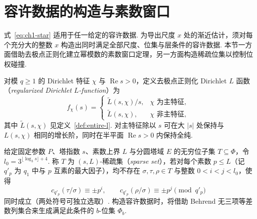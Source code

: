 \section{容许数据的构造与素数窗口}
\label{sec:data-construction}

式~\eqref{eq:ch1-star} 适用于任一给定的容许数据. 为导出尺度 $x$ 处的渐近估计，须对每个充分大的整数 $x$ 构造出同时满足全部尺度、位集与层条件的容许数据. 本节一方面借助去极点正则化建立幂模数的素数窗口定理，另一方面构造稀疏位集以控制位权碰撞.

\begin{definition}
\label{def:regular-l}
\emitthmsource
对模 $q\ge1$ 的 Dirichlet 特征 $\chi$ 与 $\operatorname{Re}s>0$，定义去极点正则化 Dirichlet $L$ 函数（\emph{regularized Dirichlet $L$-function}）为
\[
 f_\chi(s)=
 \begin{cases}
  \widetilde L(s,\chi)/s,&\chi\text{ 为主特征},\\
  \widetilde L(s,\chi),&\chi\text{ 非主特征},
 \end{cases}
\]
其中 $\widetilde L(s,\chi)$ 见定义~\ref{def:entire-l}. 对主特征除以 $s$ 可在大 $|s|$ 处保持与 $L(s,\chi)$ 相同的增长阶，同时在半平面 $\operatorname{Re}s>0$ 内保持全纯.
\end{definition}

\begin{definition}[稀疏无穷位集]
\label{def:sparse-places}
\emitthmsource
给定固定参数 $P$、塔指数 $s$、素数上界 $L$ 与分圆塔域 $E$ 的无穷位子集 $T\subseteq\Phi$，令 $l_0=3^{\lfloor\log_3 s\rfloor+4}$. 称 $T$ 为 $(s,L)$-稀疏集（\emph{sparse set}），若对每个素数 $p\le L$（记 $q'_p$ 为 $q_1$ 中与 $p$ 互素的最大因子），均不存在 $\sigma,\tau,\rho\in T$ 与整数 $0<i<j<l_0$，使得
\[
 c_{q'_p}(\tau/\sigma)\equiv\pm p^i,\qquad c_{q'_p}(\rho/\sigma)\equiv\pm p^j\pmod{q'_p}
\]
同时成立（两处符号可独立选取）. 构造容许数据时，将借助 Behrend 无三项等差数列集合来生成满足此条件的 $b$-位集 $\Phi_b$.
\end{definition}

